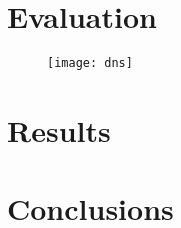 \documentclass{scrreprt}
\begin{document}
\chapter{Evaluation}
\label{evaluation}

\begin{figure}[h]
    \label{dns-transactions}
    \centering
    \texttt{[image: dns]}
    \caption{}
\end{figure}



\chapter{Results}
\label{results}


\chapter{Conclusions}
\label{conclusions}



\end{document}
